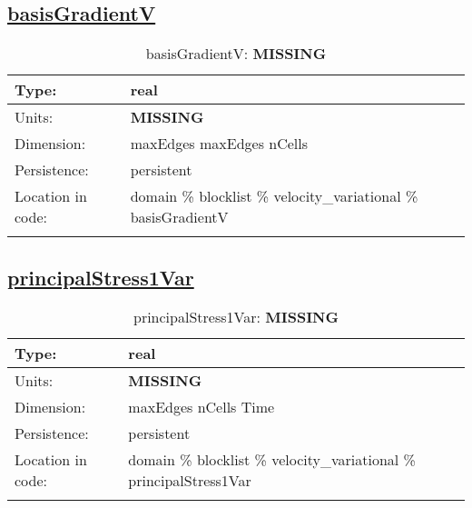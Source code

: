 \subsection[basisGradientV]{\hyperref[sec:var_tab_velocity_variational]{basisGradientV}}
\label{subsec:var_sec_velocity_variational_basisGradientV}
\begin{center}
\begin{longtable}{| p{2.0in} | p{4.0in} |}
        \hline 
        Type: & real \\
        \hline 
        Units: & {\bf \color{red} MISSING} \\
        \hline 
        Dimension: & maxEdges maxEdges nCells \\
        \hline 
        Persistence: & persistent \\
        \hline 
         Location in code: & domain \% blocklist \% velocity\_variational \% basisGradientV \\
         \hline 
    \caption{basisGradientV: {\bf \color{red} MISSING}}
\end{longtable}
\end{center}
\subsection[principalStress1Var]{\hyperref[sec:var_tab_velocity_variational]{principalStress1Var}}
\label{subsec:var_sec_velocity_variational_principalStress1Var}
\begin{center}
\begin{longtable}{| p{2.0in} | p{4.0in} |}
        \hline 
        Type: & real \\
        \hline 
        Units: & {\bf \color{red} MISSING} \\
        \hline 
        Dimension: & maxEdges nCells Time \\
        \hline 
        Persistence: & persistent \\
        \hline 
         Location in code: & domain \% blocklist \% velocity\_variational \% principalStress1Var \\
         \hline 
    \caption{principalStress1Var: {\bf \color{red} MISSING}}
\end{longtable}
\end{center}

